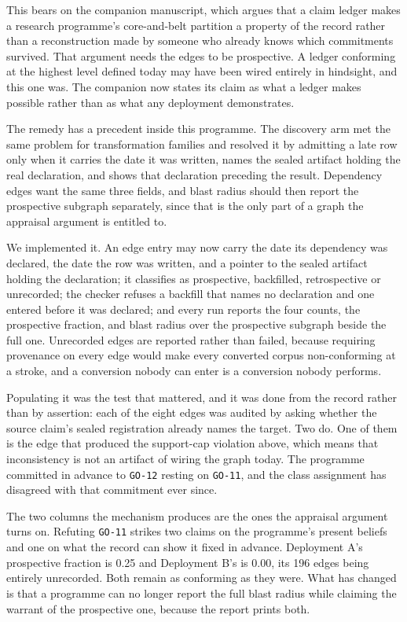 \documentclass[journal]{IEEEtran}
\begin{document}
This bears on the companion manuscript, which argues that a claim ledger makes a
research programme's core-and-belt partition a property of the record rather than
a reconstruction made by someone who already knows which commitments survived.
That argument needs the edges to be prospective. A ledger conforming at the
highest level defined today may have been wired entirely in hindsight, and this
one was. The companion now states its claim as what a ledger makes possible
rather than as what any deployment demonstrates.

The remedy has a precedent inside this programme. The discovery arm met the same
problem for transformation families and resolved it by admitting a late row only
when it carries the date it was written, names the sealed artifact holding the
real declaration, and shows that declaration preceding the result. Dependency
edges want the same three fields, and blast radius should then report the
prospective subgraph separately, since that is the only part of a graph the
appraisal argument is entitled to.

We implemented it. An edge entry may now carry the date its dependency was
declared, the date the row was written, and a pointer to the sealed artifact
holding the declaration; it classifies as prospective, backfilled, retrospective
or unrecorded; the checker refuses a backfill that names no declaration and one
entered before it was declared; and every run reports the four counts, the
prospective fraction, and blast radius over the prospective subgraph beside the
full one. Unrecorded edges are reported rather than failed, because requiring
provenance on every edge would make every converted corpus non-conforming at a
stroke, and a conversion nobody can enter is a conversion nobody performs.

Populating it was the test that mattered, and it was done from the record rather
than by assertion: each of the eight edges was audited by asking whether the
source claim's sealed registration already names the target. Two do. One of them
is the edge that produced the support-cap violation above, which means that
inconsistency is not an artifact of wiring the graph today. The programme
committed in advance to \texttt{GO-12} resting on \texttt{GO-11}, and the class
assignment has disagreed with that commitment ever since.

The two columns the mechanism produces are the ones the appraisal argument turns
on. Refuting \texttt{GO-11} strikes two claims on the programme's present
beliefs and one on what the record can show it fixed in advance. Deployment A's
prospective fraction is 0.25 and Deployment B's is 0.00, its 196 edges being
entirely unrecorded. Both remain as conforming as they were. What has changed is
that a programme can no longer report the full blast radius while claiming the
warrant of the prospective one, because the report prints both.
\end{document}
